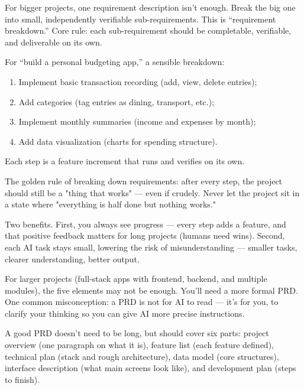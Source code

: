 For bigger projects, one requirement description isn't enough. Break the big one into small, independently verifiable sub-requirements. This is “requirement breakdown.” Core rule: each sub-requirement should be completable, verifiable, and deliverable on its own.

For “build a personal budgeting app,” a sensible breakdown:

\begin{enumerate}
  \item Implement basic transaction recording (add, view, delete entries);
  \item Add categories (tag entries as dining, transport, etc.);
  \item Implement monthly summaries (income and expenses by month);
  \item Add data visualization (charts for spending structure).
\end{enumerate}

Each step is a feature increment that runs and verifies on its own.

The golden rule of breaking down requirements: after every step, the project should still be a "thing that works" — even if crudely. Never let the project sit in a state where "everything is half done but nothing works."

Two benefits. First, you always see progress — every step adds a feature, and that positive feedback matters for long projects (humans need wins). Second, each AI task stays small, lowering the risk of misunderstanding — smaller tasks, clearer understanding, better output.


For larger projects (full-stack apps with frontend, backend, and multiple modules), the five elements may not be enough. You'll need a more formal PRD. One common misconception: a PRD is not for AI to read — it's for you, to clarify your thinking so you can give AI more precise instructions.

A good PRD doesn't need to be long, but should cover six parts: project overview (one paragraph on what it is), feature list (each feature defined), technical plan (stack and rough architecture), data model (core structures), interface description (what main screens look like), and development plan (steps to finish).

